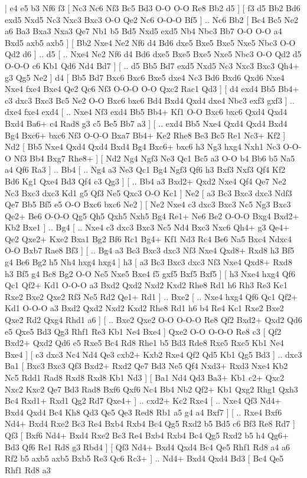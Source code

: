 \makegametitle 
|   e4   e5    b3   Nf6    f3 [  Nc3 Nc6  Nf3 Bc5  Bd3 O-O  O-O Re8  Bb2 d5   ]  [  f3 d5  Bb2 Bd6  exd5 Nxd5  Nc3 Nxc3  Bxc3 O-O  Qe2 Nc6  O-O-O Bf5   ] .. Nc6    Bb2 [  Bc4 Bc5  Ne2 a6  Ba3 Bxa3  Nxa3 Qe7  Nb1 b5  Bd5 Nxd5  exd5 Nb4  Nbc3 Bb7  O-O O-O  a4 Bxd5  axb5 axb5   ]  [  Bb2 Nxe4  Ne2 Nf6  d4 Bd6  dxe5 Bxe5  Bxe5 Nxe5  Nbc3 O-O  Qd2 d6   ] .. d5 [ .. Nxe4  Ne2 Nf6  d4 Bd6  dxe5 Bxe5  Bxe5 Nxe5  Nbc3 O-O  Qd2 d5  O-O-O c6  Kb1 Qd6  Nd4 Bd7   ]  [ .. d5  Bb5 Bd7  exd5 Nxd5  Nc3 Nxc3  Bxc3 Qh4+  g3 Qg5  Ne2   ]  d4 [  Bb5 Bd7  Bxc6 Bxc6  Bxe5 dxe4  Nc3 Bd6  Bxd6 Qxd6  Nxe4 Nxe4  fxe4 Bxe4  Qe2 Qc6  Nf3 O-O-O  O-O Qxc2  Rac1 Qd3   ]  [  d4 exd4  Bb5 Bb4+  c3 dxc3  Bxc3 Bc5  Ne2 O-O  Bxc6 bxc6  Bd4 Bxd4  Qxd4 dxe4  Nbc3 exf3  gxf3   ] .. dxe4    fxe4   exd4 [ .. Nxe4  Nf3 exd4  Bb5 Bb4+  Kf1 O-O  Bxc6 bxc6  Qxd4 Qxd4  Bxd4 Ba6+  c4 Rad8  g3 c5  Be5 Bb7  a3   ]  [ .. exd4  Bb5 Nxe4  Qxd4 Qxd4  Bxd4 Bg4  Bxc6+ bxc6  Nf3 O-O-O  Bxa7 Bb4+  Ke2 Rhe8  Be3 Bc5  Re1 Nc3+  Kf2   ]  Nd2 [  Bb5 Nxe4  Qxd4 Qxd4  Bxd4 Bg4  Bxc6+ bxc6  h3 Ng3  hxg4 Nxh1  Nc3 O-O-O  Nf3 Bb4  Bxg7 Rhe8+   ]  [  Nd2 Ng4  Ngf3 Ne3  Qc1 Bc5  a3 O-O  b4 Bb6  b5 Na5  a4 Qf6  Ra3   ] .. Bb4 [ .. Ng4  a3 Ne3  Qc1 Bg4  Ngf3 Qf6  h3 Bxf3  Nxf3 Qf4  Kf2 Bd6  Kg1 Qxe4  Bd3 Qf4  c3 Qg3   ]  [ .. Bb4  a3 Bxd2+  Qxd2 Nxe4  Qf4 Qe7  Ne2 Nc3  Bxc3 dxc3  Kd1 g5  Qf3 Ne5  Qxc3 O-O  Kc1   ]  Ne2 [  a3 Bc3  Bxc3 dxc3  Ndf3 Qe7  Bb5 Bf5  e5 O-O  Bxc6 bxc6  Ne2   ]  [  Ne2 Nxe4  c3 dxc3  Bxc3 Nc5  Ng3 Bxc3  Qe2+ Be6  O-O-O Qg5  Qh5 Qxh5  Nxh5 Bg4  Re1+ Ne6  Be2 O-O-O  Bxg4 Bxd2+  Kb2 Bxe1   ] .. Bg4 [ .. Nxe4  c3 dxc3  Bxc3 Nc5  Nd4 Bxc3  Nxc6 Qh4+  g3 Qe4+  Qe2 Qxe2+  Kxe2 Bxa1  Bg2 Bf6  Rc1 Bg4+  Kf1 Nd3  Rc4 Be6  Na5 Bxc4  Ndxc4 O-O  Bxb7 Rae8  Bf3   ]  [ .. Bg4  a3 Bc3  Bxc3 dxc3  Nf3 Nxe4  Qxd8+ Rxd8  h3 Bf5  g4 Be6  Bg2 h5  Nh4 hxg4  hxg4   ]  h3 [  a3 Bc3  Bxc3 dxc3  Nf3 Nxe4  Qxd8+ Rxd8  h3 Bf5  g4 Bc8  Bg2 O-O  Ne5 Nxe5  Bxe4 f5  gxf5 Bxf5  Bxf5   ]  [  h3 Nxe4  hxg4 Qf6  Qc1 Qf2+  Kd1 O-O-O  a3 Bxd2  Qxd2 Nxd2  Kxd2 Rhe8  Rd1 h6  Rh3 Re3  Kc1 Rxe2  Bxe2 Qxe2  Rf3 Ne5  Rd2 Qe1+  Rd1   ] .. Bxe2 [ .. Nxe4  hxg4 Qf6  Qc1 Qf2+  Kd1 O-O-O  a3 Bxd2  Qxd2 Nxd2  Kxd2 Rhe8  Rd1 h6  b4 Re4  Kc1 Rxe2  Bxe2 Qxe2  Rd2 Qxg4  Rhd1 a6   ]  [ .. Bxe2  Qxe2 O-O  O-O-O Re8  Qf2 Bxd2+  Qxd2 Qd6  e5 Qxe5  Bd3 Qg3  Rhf1 Re3  Kb1 Ne4  Bxe4   ]  Qxe2   O-O    O-O-O   Re8    c3 [  Qf2 Bxd2+  Qxd2 Qd6  e5 Rxe5  Bc4 Rd8  Rhe1 b5  Bd3 Rde8  Rxe5 Rxe5  Kb1 Ne4  Bxe4   ]  [  c3 dxc3  Nc4 Nd4  Qe3 cxb2+  Kxb2 Rxe4  Qf2 Qd5  Kb1 Qg5  Bd3   ] .. dxc3    Ba1 [  Bxc3 Bxc3  Qf3 Bxd2+  Rxd2 Qe7  Bd3 Ne5  Qf4 Nxd3+  Rxd3 Nxe4  Kb2 Nc5  Rdd1 Rad8  Rxd8 Rxd8  Kb1 Nd3   ]  [  Ba1 Nd4  Qd3 Ba3+  Kb1 c2+  Qxc2 Nxc2  Kxc2 Qe7  Bd3 Rad8  Bxf6 Qxf6  Nc4 Bb4  Nb2 Qf2+  Kb1 Qxg2  Rhg1 Qxh3  Bc4 Rxd1+  Rxd1 Qg2  Rd7 Qxe4+   ] .. cxd2+    Kc2   Rxe4 [ .. Nxe4  Qf3 Nd4+  Bxd4 Qxd4  Bc4 Kh8  Qd3 Qe5  Qe3 Red8  Rb1 a5  g4 a4  Bxf7   ]  [ .. Rxe4  Bxf6 Nd4+  Bxd4 Rxe2  Bc3 Re4  Bxb4 Rxb4  Bc4 Qg5  Rxd2 b5  Bd5 c6  Bf3 Re8  Rd7   ]  Qf3 [  Bxf6 Nd4+  Bxd4 Rxe2  Bc3 Re4  Bxb4 Rxb4  Bc4 Qg5  Rxd2 b5  h4 Qg6+  Bd3 Qf6  Re1 Rd8  g3 Rbd4   ]  [  Qf3 Nd4+  Bxd4 Qxd4  Bc4 Qe5  Rhf1 Rd8  a4 a6  Rf2 b5  axb5 axb5  Bxb5 Re3  Qc6 Rc3+   ] .. Nd4+    Bxd4   Qxd4    Bd3 [  Bc4 Qe5  Rhf1 Rd8  a3 